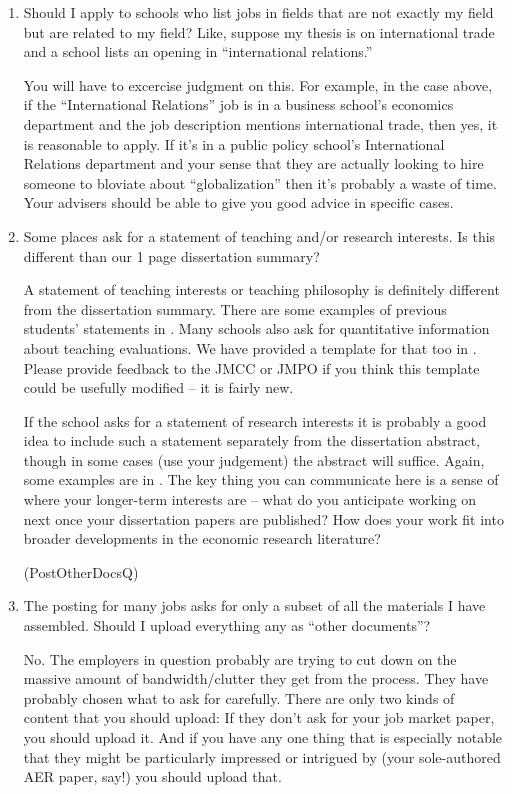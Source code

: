 \documentclass{econtex}
\providecommand\phantomsection{}
\begin{document}
\begin{enumerate}
\item Should I apply to schools who list jobs in fields that are not exactly my field but are related to my
field?  Like, suppose my thesis is on international trade and a school lists
an opening in ``international relations.''

You will have to excercise judgment on this.  For example, in the case
above, if the ``International Relations'' job is in a business
school's economics department and the job description mentions
international trade, then yes, it is reasonable to apply.  If it's in
a public policy school's International Relations department and your
sense that they are actually looking to hire someone to bloviate about
``globalization'' then it's probably a waste of time.  Your advisers
should be able to give you good advice in specific cases.

\item Some places ask for a statement of teaching and/or research
  interests.  Is this different than our 1 page
  dissertation summary?

  A statement of teaching interests or teaching philosophy is
  definitely different from the dissertation summary.  There are some
  examples of previous students' statements in \Resources.  Many
  schools also ask for quantitative information about teaching
  evaluations.  We have provided a template for that too in
  \Templates.  Please provide feedback to the JMCC or JMPO if you
  think this template could be usefully modified -- it is fairly new.

If the school asks for a statement of research interests it is probably
a good idea to include such a statement separately from the dissertation
abstract, though in some cases (use your judgement) the abstract will suffice.  Again, some examples are in \Resources.  
The key thing you can communicate here is a sense of where your longer-term 
interests are -- what do you anticipate working on next once your dissertation
papers are published?  How does your work fit into broader developments in 
the economic research literature?

\ifdvi\phantomsection\hypertarget{PostOtherDocsQ}{(PostOtherDocsQ)}\fi
\item The {\JOE} posting for many jobs asks for only a subset of all the materials I have assembled.  Should I upload everything any as ``other documents''?

  No. The employers in question probably are trying to cut down on the massive amount of bandwidth/clutter they get from the process.  They have probably chosen what to ask for carefully.  There are only two kinds of content that you should upload: If they don't ask for your job market paper, you should upload it. And if you have any one thing that is especially notable that they might be particularly impressed or intrigued by (your sole-authored AER paper, say!) you should upload that.


\end{enumerate}
\end{document}
